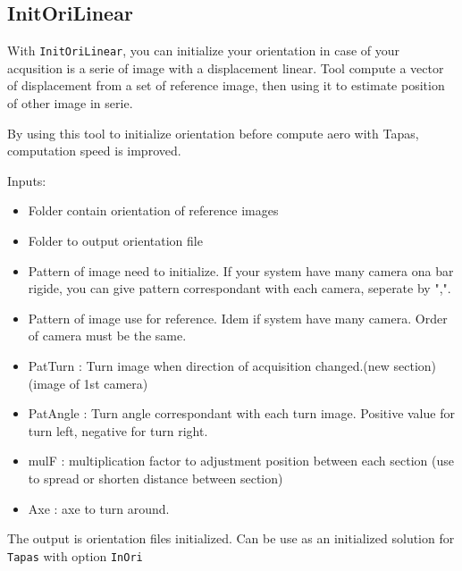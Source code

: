 \subsection{InitOriLinear}

With {\tt InitOriLinear}, you can initialize your orientation in case of your acqusition is a serie of image with a displacement linear. Tool compute a vector of displacement from a set of reference image, then using it to estimate position of other image in serie.

By using this tool to initialize orientation before compute aero with Tapas, computation speed is improved.

Inputs:
\begin{itemize}
\item Folder contain orientation of reference images
\item Folder to output orientation file
\item Pattern of image need to initialize. If your system have many camera ona bar rigide, you can give pattern correspondant with each camera, seperate by ",".
\item Pattern of image use for reference. Idem if system have many camera. Order of camera must be the same.

\item PatTurn : Turn image when direction of acquisition changed.(new section) (image of 1st camera)
\item PatAngle : Turn angle correspondant with each turn image. Positive value for turn left, negative for turn right.
\item mulF : multiplication factor to adjustment position between each section (use to spread or shorten distance between section)
\item Axe : axe to turn around.
\end{itemize}

The output is orientation files initialized. Can be use as an initialized solution for {\tt Tapas} with option {\tt InOri}

